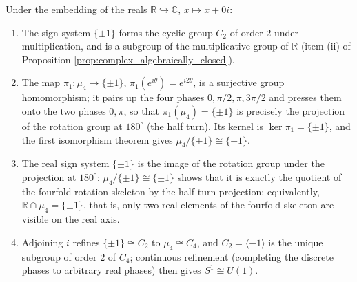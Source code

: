 \begin{proposition}\label{prop:sign_as_half_turn_projection}
Under the embedding of the reals $\mathbb{R}\hookrightarrow\mathbb{C}$, $x\mapsto x+0i$:
\begin{enumerate}[label=(\roman*)]
    \item The sign system $\{\pm1\}$ forms the cyclic group $C_2$ of order $2$ under multiplication, and is a subgroup of the multiplicative group of $\mathbb{R}$ (item (ii) of Proposition \ref{prop:complex_algebraically_closed}).
    \item The map $\pi_1:\mu_4\to\{\pm1\}$, $\pi_1(e^{i\theta})=e^{i2\theta}$, is a surjective group homomorphism; it pairs up the four phases $0,\pi/2,\pi,3\pi/2$ and presses them onto the two phases $0,\pi$, so that $\pi_1(\mu_4)=\{\pm1\}$ is precisely the projection of the rotation group at $180^\circ$ (the half turn). Its kernel is $\ker\pi_1=\{\pm1\}$, and the first isomorphism theorem gives $\mu_4/\{\pm1\}\cong\{\pm1\}$.
    \item The real sign system $\{\pm1\}$ is the image of the rotation group under the projection at $180^\circ$: $\mu_4/\{\pm1\}\cong\{\pm1\}$ shows that it is exactly the quotient of the fourfold rotation skeleton by the half-turn projection; equivalently, $\mathbb{R}\cap\mu_4=\{\pm1\}$, that is, only two real elements of the fourfold skeleton are visible on the real axis.
    \item Adjoining $i$ refines $\{\pm1\}\cong C_2$ to $\mu_4\cong C_4$, and $C_2=\langle-1\rangle$ is the unique subgroup of order $2$ of $C_4$; continuous refinement (completing the discrete phases to arbitrary real phases) then gives $S^1\cong U(1)$.
\end{enumerate}
\end{proposition}


